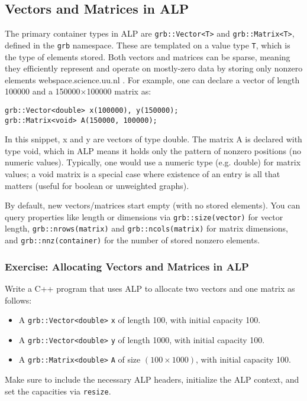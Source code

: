 \subsection{Vectors and Matrices in ALP}

The primary container types in ALP are \texttt{grb::Vector<T>} and \texttt{grb::Matrix<T>}, defined in the \texttt{grb} namespace. These are templated on a value type \texttt{T}, which is the type of elements stored. Both vectors and matrices can be sparse, meaning they efficiently represent and operate on mostly-zero data by storing only nonzero elements
webspace.science.uu.nl
. For example, one can declare a vector of length 100000 and a 150000$\times$100000 matrix as:
\begin{lstlisting}
grb::Vector<double> x(100000), y(150000);
grb::Matrix<void> A(150000, 100000);
\end{lstlisting}
In this snippet, x and y are vectors of type double. The matrix A is declared with type void, which in ALP means it holds only the pattern of nonzero positions (no numeric values). Typically, one would use a numeric type (e.g. double) for matrix values; a void matrix is a special case where existence of an entry is all that matters (useful for boolean or unweighted graphs).

By default, new vectors/matrices start empty (with no stored elements). You can query properties like length or dimensions via \texttt{grb::size(vector)} for vector length, \texttt{grb::nrows(matrix)} and \texttt{grb::ncols(matrix)} for matrix dimensions, and \texttt{grb::nnz(container)} for the number of stored nonzero elements.

\subsubsection{Exercise: Allocating Vectors and Matrices in ALP}

Write a C++ program that uses ALP to allocate two vectors and one matrix as follows:
\begin{itemize}
  \item A \texttt{grb::Vector<double>} \texttt{x} of length 100, with initial capacity 100.
  \item A \texttt{grb::Vector<double>} \texttt{y} of length 1000, with initial capacity 100.
  \item A \texttt{grb::Matrix<double>} \texttt{A} of size $(100 \times 1000)$, with initial capacity 100.
\end{itemize}
Make sure to include the necessary ALP headers, initialize the ALP context, and set the capacities via \texttt{resize}.

